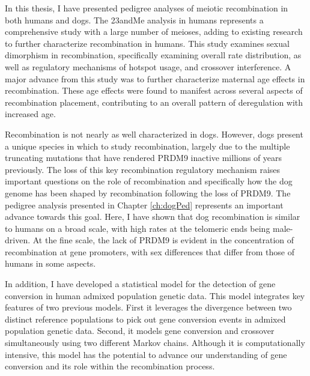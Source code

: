 



In this thesis, I have presented pedigree analyses of meiotic recombination in both humans and dogs.
The 23andMe analysis in humans represents a comprehensive study with a large number of meioses, adding to existing research to further characterize recombination in humans. %
This study examines sexual dimorphism in recombination, specifically examining overall rate distribution, as well as regulatory mechanisms of hotspot usage, and crossover interference.
A major advance from this study was to further characterize maternal age effects in recombination.
These age effects were found to manifest across several aspects of recombination placement, contributing to an overall pattern of deregulation with increased age.

Recombination is not nearly as well characterized in dogs.
However, dogs present a unique species in which to study recombination, largely due to the multiple truncating mutations that have rendered PRDM9 inactive millions of years previously.
The loss of this key recombination regulatory mechanism raises important questions on the role of recombination and specifically how the dog genome has been shaped by recombination following the loss of PRDM9.
The pedigree analysis presented in Chapter \ref{ch:dogPed} represents an important advance towards this goal.
Here, I have shown that dog recombination is similar to humans on a broad scale, with high rates at the telomeric ends being male-driven.
At the fine scale, the lack of PRDM9 is evident in the concentration of recombination at gene promoters, with sex differences that differ from those of humans in some aspects.

In addition, I have developed a statistical model for the detection of gene conversion in human admixed population genetic data.
This model integrates key features of two previous models.
First it leverages the divergence between two distinct reference populations to pick out gene conversion events in admixed population genetic data.
Second, it models gene conversion and crossover simultaneously using two different Markov chains.
Although it is computationally intensive, this model has the potential to advance our understanding of gene conversion and its role within the recombination process.

